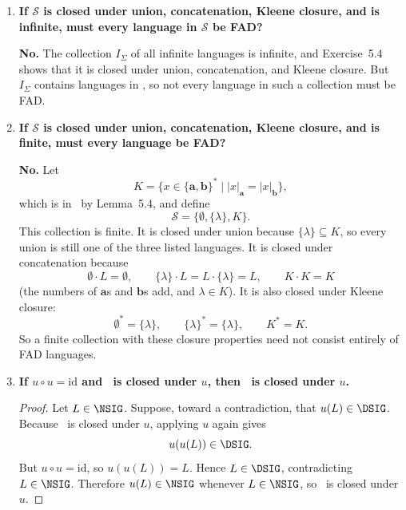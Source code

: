 \begin{enumerate}[{5.}1. ]
\item \textbf{If $\mathcal{S}$ is closed under union, concatenation, Kleene closure, and is infinite, must every language in $\mathcal{S}$ be FAD?}

\textbf{No.}  The collection $I_\Sigma$ of all infinite languages is infinite,
and Exercise~5.4 shows that it is closed under union, concatenation, and Kleene
closure.  But $I_\Sigma$ contains languages in \NSIG, so not every language in
such a collection must be FAD.

\item \textbf{If $\mathcal{S}$ is closed under union, concatenation, Kleene closure, and is finite, must every language be FAD?}

\textbf{No.}  Let
\[
K=\{x\in\{\pmb{a},\pmb{b}\}^*\mid |x|_{\pmb{a}}=|x|_{\pmb{b}}\},
\]
which is in \NSIG\ by Lemma~5.4, and define
\[
\mathcal{S}=\{\emptyset,\{\lambda\},K\}.
\]
This collection is finite.  It is closed under union because
$\{\lambda\}\subseteq K$, so every union is still one of the three listed
languages.  It is closed under concatenation because
\[
\emptyset\cdot L=\emptyset,\qquad \{\lambda\}\cdot L=L\cdot\{\lambda\}=L,
\qquad K\cdot K=K
\]
(the numbers of $\pmb{a}$s and $\pmb{b}$s add, and $\lambda\in K$).  It is also
closed under Kleene closure:
\[
\emptyset^*=\{\lambda\},\qquad \{\lambda\}^*=\{\lambda\},\qquad K^*=K.
\]
So a finite collection with these closure properties need not consist entirely of
FAD languages.

\item \textbf{If $u\circ u=\text{id}$ and \DSIG\ is closed under $u$, then \NSIG\ is closed under $u$.}

\begin{proof}
Let $L\in\NSIG$.  Suppose, toward a contradiction, that $u(L)\in\DSIG$.
Because \DSIG\ is closed under $u$, applying $u$ again gives
\[
u(u(L))\in\DSIG.
\]
But $u\circ u=\mathrm{id}$, so $u(u(L))=L$.  Hence $L\in\DSIG$, contradicting
$L\in\NSIG$.  Therefore $u(L)\in\NSIG$ whenever $L\in\NSIG$, so \NSIG\ is closed
under $u$.
\end{proof}

\end{enumerate}
